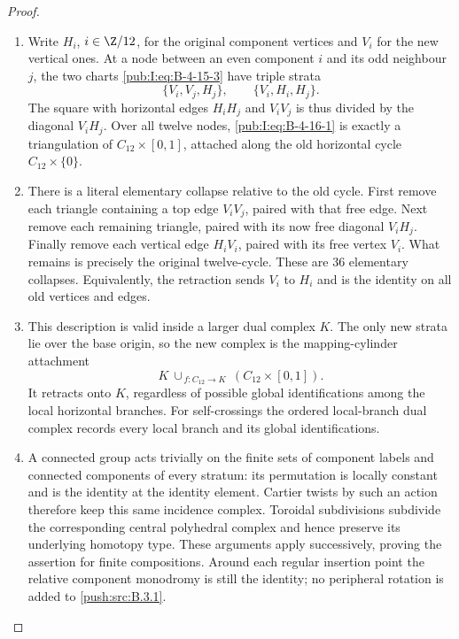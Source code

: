 \begin{proof}
\begin{enumerate}[label=\arabic*.,leftmargin=*]
\item Write $H_i$, $i\in\Z/12$, for the original component
vertices and $V_i$ for the new vertical ones. At a node
between an even component $i$ and its odd neighbour
$j$, the two charts \eqref{pub:I:eq:B-4-15-3} have triple strata
\begin{equation}
 \{V_i,V_j,H_j\},\qquad
 \{V_i,H_i,H_j\}.
\label{pub:I:eq:B-4-16-1}
\end{equation}
The square with horizontal edges $H_iH_j$ and $V_iV_j$
is thus divided by the diagonal $V_iH_j$. Over all
twelve nodes, \eqref{pub:I:eq:B-4-16-1} is exactly a triangulation of
$C_{12}\times[0,1]$, attached along the old horizontal
cycle $C_{12}\times\{0\}$.

\item There is a literal elementary collapse relative to the
old cycle. First remove each triangle containing a top
edge $V_iV_j$, paired with that free edge. Next remove
each remaining triangle, paired with its now free
diagonal $V_iH_j$. Finally remove each vertical edge
$H_iV_i$, paired with its free vertex $V_i$. What remains
is precisely the original twelve-cycle. These are
$36$ elementary collapses. Equivalently, the retraction
sends $V_i$ to $H_i$ and is the identity on all old
vertices and edges.

\item This description is valid inside a larger dual complex
$K$. The only new strata lie over the base origin,
so the new complex is the mapping-cylinder attachment
\[
 K\ \cup_{\,f:C_{12}\to K}\
           (C_{12}\times[0,1]).
\]
It retracts onto $K$, regardless of possible global
identifications among the local horizontal branches.
For self-crossings the ordered local-branch dual complex records
every local branch and its global identifications.

\item A connected group acts trivially on the finite sets
of component labels and connected components of every
stratum: its permutation is locally constant and is
the identity at the identity element. Cartier twists
by such an action therefore keep this same incidence
complex. Toroidal subdivisions subdivide the
corresponding central polyhedral complex and hence
preserve its underlying homotopy type. These arguments
apply successively, proving the assertion for finite
compositions. Around each regular insertion point the
relative component monodromy is still the identity;
no peripheral rotation is added to \ref{push:src:B.3.1}.


\end{enumerate}
\end{proof}
